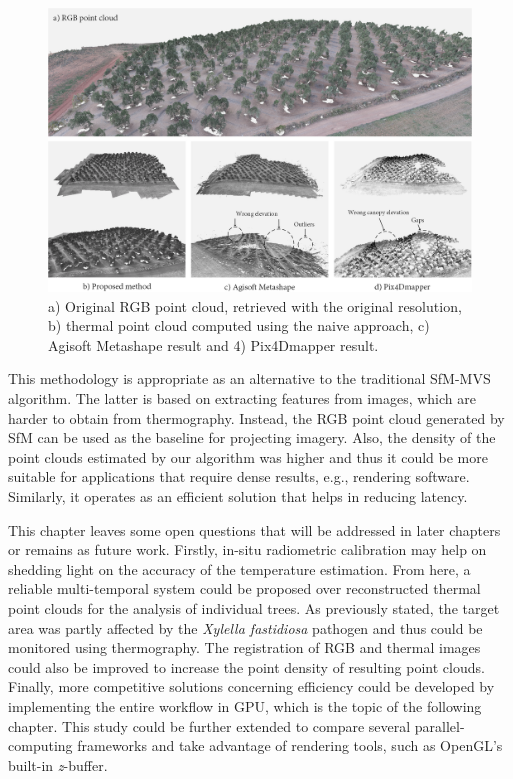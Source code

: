 \begin{figure}[htb]
    \centering
    \includegraphics[width=\linewidth]{figs/thermal_projection/thermal_visualization_comparison.png}
	\caption{a) Original RGB point cloud, retrieved with the original resolution, b) thermal point cloud computed using the naive approach, c) Agisoft Metashape result and 4) Pix4Dmapper result. }
	\label{fig:thermal_point_cloud_comparison}
\end{figure}

This methodology is appropriate as an alternative to the traditional SfM-MVS algorithm. The latter is based on extracting features from images, which are harder to obtain from thermography. Instead, the RGB point cloud generated by SfM can be used as the baseline for projecting imagery. Also, the density of the point clouds estimated by our algorithm was higher and thus it could be more suitable for applications that require dense results, e.g., rendering software. Similarly, it operates as an efficient solution that helps in reducing latency.

This chapter leaves some open questions that will be addressed in later chapters or remains as future work. Firstly, in-situ radiometric calibration may help on shedding light on the accuracy of the temperature estimation. From here, a reliable multi-temporal system could be proposed over reconstructed thermal point clouds for the analysis of individual trees. As previously stated, the target area was partly affected by the \textit{Xylella fastidiosa} pathogen and thus could be monitored using thermography. The registration of RGB and thermal images could also be improved to increase the point density of resulting point clouds. Finally, more competitive solutions concerning efficiency could be developed by implementing the entire workflow in GPU, which is the topic of the following chapter. This study could be further extended to compare several parallel-computing frameworks and take advantage of rendering tools, such as OpenGL's built-in \textit{z}-buffer.